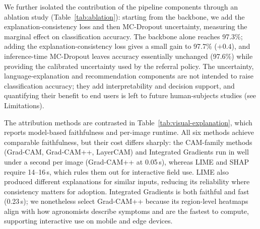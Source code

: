\documentclass[pdflatex,sn-mathphys-num]{sn-jnl}%
\begin{document}
We further isolated the contribution of the pipeline components through an ablation study (Table~\ref{tab:ablation}): starting from the backbone, we add the explanation-consistency loss and then MC-Dropout uncertainty, measuring the marginal effect on classification accuracy. The backbone alone reaches 97.3\%; adding the explanation-consistency loss gives a small gain to 97.7\% ($+0.4$), and inference-time MC-Dropout leaves accuracy essentially unchanged (97.6\%) while providing the calibrated uncertainty used by the referral policy. The uncertainty, language-explanation and recommendation components are not intended to raise classification accuracy; they add interpretability and decision support, and quantifying their benefit to end users is left to future human-subjects studies (see Limitations).

The attribution methods are contrasted in Table~\ref{tab:visual-explanation}, which reports model-based faithfulness and per-image runtime. All six methods achieve comparable faithfulness, but their cost differs sharply: the CAM-family methods (Grad-CAM, Grad-CAM++, LayerCAM) and Integrated Gradients run in well under a second per image (Grad-CAM++ at 0.05\,s), whereas LIME and SHAP require 14--16\,s, which rules them out for interactive field use. LIME also produced different explanations for similar inputs, reducing its reliability where consistency matters for adoption. Integrated Gradients is both faithful and fast (0.23\,s); we nonetheless select Grad-CAM++ because its region-level heatmaps align with how agronomists describe symptoms and are the fastest to compute, supporting interactive use on mobile and edge devices.
\end{document}
